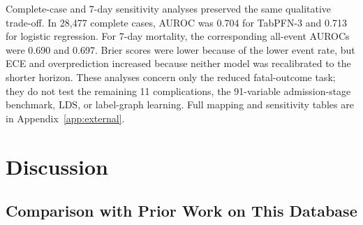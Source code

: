 \documentclass{ieeeaccess}
\begin{document}
Complete-case and 7-day sensitivity analyses preserved the same qualitative trade-off. In 28,477 complete cases, AUROC was 0.704 for TabPFN-3 and 0.713 for logistic regression. For 7-day mortality, the corresponding all-event AUROCs were 0.690 and 0.697. Brier scores were lower because of the lower event rate, but ECE and overprediction increased because neither model was recalibrated to the shorter horizon. These analyses concern only the reduced fatal-outcome task; they do not test the remaining 11 complications, the 91-variable admission-stage benchmark, $\mathrm{LDS}$, or label-graph learning. Full mapping and sensitivity tables are in Appendix~\ref{app:external}.

\FloatBarrier

\section{Discussion}
\label{sec:discussion}

\subsection{Comparison with Prior Work on This Database}

\begin{table}[!t]
\caption{Comparison with Prior Work on the Same Database}
\label{tab:prior}
\centering
\footnotesize
\setlength{\tabcolsep}{2pt}
\end{table}
\end{document}
